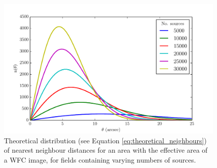 \documentclass[a4paper,useAMS,usenatbib]{mn2e}
\begin{document}

\begin{figure}
\begin{center}
\includegraphics[width=1\linewidth]{figures/theoretical_neighbours.pdf} 
\caption{\footnotesize Theoretical distribution (see Equation  \ref{eq:theoretical_neighbours}) of nearest neighbour distances for an area with the effective area of a WFC image, for fields containing varying numbers of sources.}
\label{fig:theoretical_neighbours}
\end{center}
\end{figure}
\end{document}
